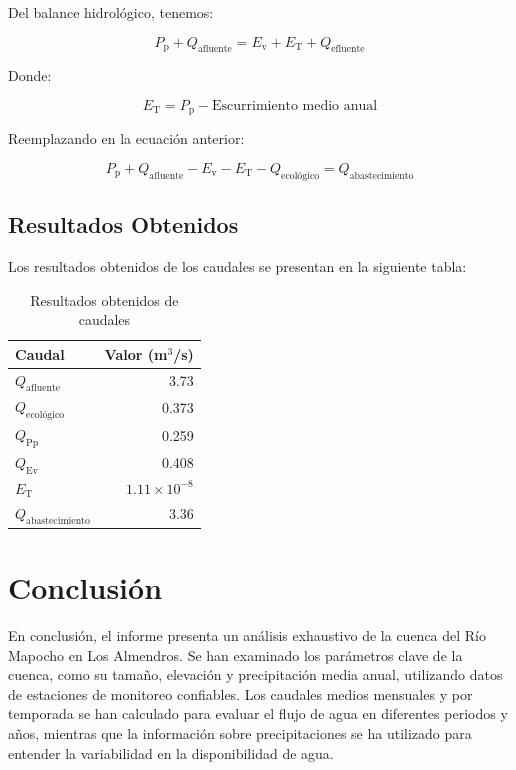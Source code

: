 \documentclass{article} %
\begin{document}
Del balance hidrológico, tenemos:

\begin{equation}
    P_{\text{p}} + Q_{\text{afluente}} = E_{\text{v}} + E_{\text{T}} + Q_{\text{efluente}}
\end{equation}

Donde:

\begin{equation}
    E_{\text{T}} = P_{\text{p}} - \text{Escurrimiento medio anual}
\end{equation}

Reemplazando en la ecuación anterior:

\begin{equation}
    P_{\text{p}} + Q_{\text{afluente}} - E_{\text{v}} - E_{\text{T}} - Q_{\text{ecológico}} = Q_{\text{abastecimiento}}
\end{equation}

\newpage
\subsection{Resultados Obtenidos}

Los resultados obtenidos de los caudales se presentan en la siguiente tabla:

\begin{table}[h]
    \centering
    \caption{Resultados obtenidos de caudales}
    \begin{tabular}{lr}
        \toprule
        \textbf{Caudal} & \textbf{Valor (m\(^3\)/s)} \\
        \midrule
        \(Q_{\text{afluente}}\) & 3.73 \\
        \(Q_{\text{ecológico}}\) & 0.373 \\
        \(Q_{\text{Pp}}\) & 0.259 \\
        \(Q_{\text{Ev}}\) & 0.408 \\
        \(E_{\text{T}}\) & \(1.11 \times 10^{-8}\) \\
        \(Q_{\text{abastecimiento}}\) & 3.36 \\
        \bottomrule
    \end{tabular}
\end{table}

\newpage
\section{Conclusión}
En conclusión, el informe presenta un análisis exhaustivo de la cuenca del Río Mapocho en Los Almendros. Se han examinado los parámetros clave de la cuenca, como su tamaño, elevación y precipitación media anual, utilizando datos de estaciones de monitoreo confiables. Los caudales medios mensuales y por temporada se han calculado para evaluar el flujo de agua en diferentes periodos y años, mientras que la información sobre precipitaciones se ha utilizado para entender la variabilidad en la disponibilidad de agua.
\end{document}
